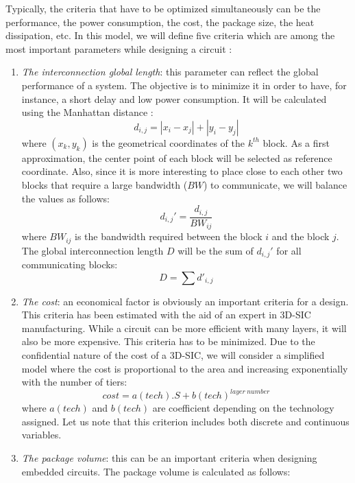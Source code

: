 Typically, the criteria that have to be optimized simultaneously can be the performance, the power consumption, the cost, the package size, the heat dissipation, etc. In this model, we will define five criteria which are among the most important parameters while designing a circuit \cite{DBLP:conf/3dic/MilojevicCCRRSAPM09}:
\begin{enumerate}
\item \textit{The interconnection global length}: this parameter can reflect the global performance of a system. The objective is to minimize it in order to have, for instance, a short delay and low power consumption. It will be calculated using the Manhattan distance \cite{mandist06}:
\begin{equation}
d_{i,j}=|x_i-x_j|+|y_i-y_j|
\end{equation}
where $(x_k, y_k)$ is the geometrical coordinates of the $k^{th}$ block. As a first approximation, the center point of each block will be selected as reference coordinate. Also, since it is more interesting to place close to each other two blocks that require a large bandwidth ($BW$) to communicate, we will balance the values as follows:
\begin{equation}
d_{i,j}'=\frac{d_{i,j}}{BW_{ij}}
\end{equation}
where $BW_{ij}$ is the bandwidth required between the block $i$ and the block $j$. The global interconnection length $D$ will be the sum of $d_{i,j}'$ for all communicating blocks:
\begin{equation}
D=\sum d'_{i,j}
\end{equation}
\item \textit{The cost}: an economical factor is obviously an important criteria for a design. This criteria has been estimated with the aid of an expert in 3D-SIC manufacturing. While a circuit can be more efficient with many layers, it will also be more expensive. This criteria has to be minimized. Due to the confidential nature of the cost of a 3D-SIC, we will consider a simplified model where the cost is proportional to the area and increasing exponentially with the number of tiers:
\begin{equation}
cost=a(tech).S+b(tech)^{layer~number}
\label{eqn:cost}
\end{equation}
where $a(tech)$ and $b(tech)$ are coefficient depending on the technology assigned.
Let us note that this criterion includes both discrete and continuous variables.
\item \textit{The package volume}: this can be an important criteria when designing embedded circuits. The package volume is calculated as follows:

\end{enumerate}
